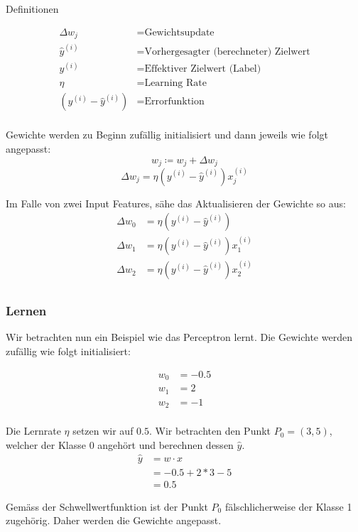 \begin{flushleft}
Definitionen

\begin{align*}
\Delta w_{j}  &= \text{Gewichtsupdate} \\
\hat{y}^{(i)} &= \text{Vorhergesagter (berechneter) Zielwert} \\
y^{(i)} &= \text{Effektiver Zielwert (Label)} \\
\eta &= \text{Learning Rate} \\
(y^{(i)} - \hat{y}^{(i)}) &= \text{Errorfunktion} \\
\end{align*}

Gewichte werden zu Beginn zufällig initialisiert und dann jeweils wie folgt angepasst:
$$w_{j} \coloneqq w_{j} + \Delta w_{j}$$
$$\Delta w_{j} = \eta (y^{(i)} - \hat{y}^{(i)}) x_{j}^{(i)}$$

Im Falle von zwei Input Features, sähe das Aktualisieren der Gewichte so aus:
\begin{align*}
\Delta w_{0} &= \eta (y^{(i)} - \hat{y}^{(i)}) \\
\Delta w_{1} &= \eta (y^{(i)} - \hat{y}^{(i)}) x_{1}^{(i)} \\
\Delta w_{2} &= \eta (y^{(i)} - \hat{y}^{(i)}) x_{2}^{(i)} \\
\end{align*}



\newpage
\subsubsection{Lernen}
Wir betrachten nun ein Beispiel wie das Perceptron lernt. Die Gewichte werden zufällig wie folgt initialisiert:

\begin{align*}
	 w_{0} &= -0.5\\
	 w_{1} &= 2 \\
	 w_{2} &= -1 \\
\end{align*}

Die Lernrate $\eta$ setzen wir auf $0.5$.
Wir betrachten den Punkt $P_{0} = (3,5)$, welcher der Klasse 0 angehört und berechnen dessen $\hat{y}$.
\begin{align*}
\hat{y} &= w \cdot x \\
		&= -0.5 + 2*3 - 5 \\
		&= 0.5
\end{align*}

Gemäss der Schwellwertfunktion ist der Punkt $P_{0}$ fälschlicherweise der Klasse 1 zugehörig. Daher werden die Gewichte angepasst.


\end{flushleft}
